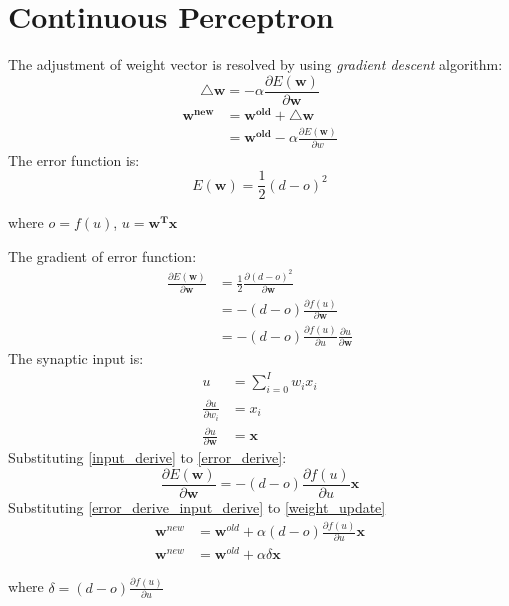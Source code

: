 \section{Continuous Perceptron}
The adjustment of weight vector is resolved by using \emph{gradient descent} algorithm:
$$\mathbf{\triangle w} = - \alpha \frac{\partial E(\mathbf{w})}{\partial \mathbf{w}}$$
\begin{equation}
\begin{split}
\mathbf{w^{new}} &= \mathbf{w^{old} + \triangle w } \\
&= \mathbf{w^{old}} - \alpha \frac{\partial E(\mathbf{w})}{\partial w}
\end{split}
\label{weight_update}
\end{equation}
The error function is:
$$E(\mathbf{w})=\frac{1}{2}(d-o)^{2}$$
\begin{center}
where 
$o = f(u)$,
$u=\mathbf{w^{T}x}$
\end{center}
The gradient of error function:
\begin{equation}
\begin{split}
\frac{\partial E(\mathbf{w})}{\partial \mathbf{w}} &= \frac{1}{2} \frac{\partial (d-o)^{2}}{\partial \mathbf{w}} \\
&= - (d-o) \frac{\partial f(u)}{\partial \mathbf{w}} \\
&= - (d-o) \frac{\partial f(u)}{\partial u} \frac{\partial u}{\partial \mathbf{w}}
\end{split}
\label{error_derive}
\end{equation}
The synaptic input is:
\begin{equation}
\begin{split}
u &= \sum_{i=0}^{I} w_i x_i \\
\frac{\partial u}{\partial w_i} &= x_i \\
\frac{\partial u}{\partial \mathbf{w}} &= \mathbf{x}
\end{split}
\label{input_derive}
\end{equation}
\noindent Substituting \ref{input_derive} to \ref{error_derive}:
\begin{equation}
\frac{\partial E(\mathbf{w})}{\partial \mathbf{w}} = - (d-o) \frac{\partial f(u)}{\partial u} \mathbf{x}
\label{error_derive_input_derive}
\end{equation}
\noindent Substituting \ref{error_derive_input_derive} to \ref{weight_update}
\begin{equation}
\begin{split}
\mathbf{w}^{new} &= \mathbf{w}^{old} + \alpha (d-o) \frac{\partial f(u)}{\partial u} \mathbf{x} \\
\mathbf{w}^{new} &= \mathbf{w}^{old} + \alpha \delta \mathbf{x}
\end{split}
\label{weight_update_2}
\end{equation}
\begin{center}where $\delta = (d-o) \frac{\partial f(u)}{\partial u}$\end{center}

